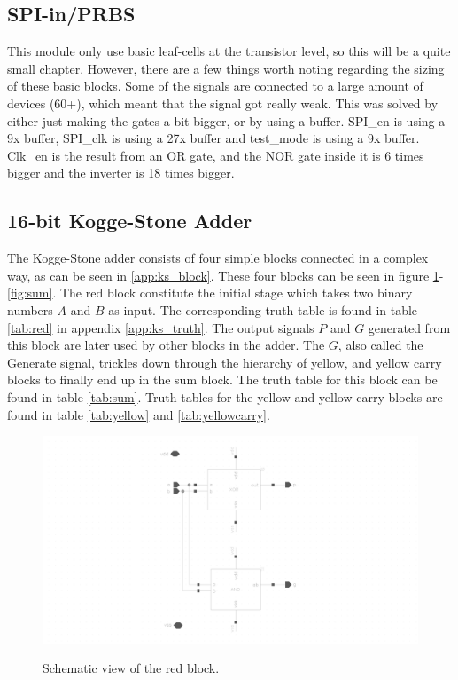 
\subsection{SPI-in/PRBS}
This module only use basic leaf-cells at the transistor level, so this will be a quite small chapter. However, there are a few things worth noting regarding the sizing of these basic blocks. Some of the signals are connected to a large amount of devices (60+), which meant that the signal got really weak. This was solved by either just making the gates a bit bigger, or by using a buffer. SPI\_en is using a 9x buffer, SPI\_clk is using a 27x buffer and test\_mode is using a 9x buffer. Clk\_en is the result from an OR gate, and the NOR gate inside it is 6 times bigger and the inverter is 18 times bigger.

\subsection{16-bit Kogge-Stone Adder}
The Kogge-Stone adder consists of four simple blocks connected in a complex way, as can be seen in \ref{app:ks_block}. These four blocks can be seen in figure \ref{fig:red}-\ref{fig:sum}. The red block constitute the initial stage which takes two binary numbers $A$ and $B$ as input. The corresponding truth table is found in table \ref{tab:red} in appendix \ref{app:ks_truth}. The output signals $P$ and $G$ generated from this block are later used by other blocks in the adder. The $G$, also called the Generate signal, trickles down through the hierarchy of yellow, and yellow carry blocks to finally end up in the sum block. The truth table for this block can be found in table \ref{tab:sum}. Truth tables for the yellow and yellow carry blocks are found in table \ref{tab:yellow} and \ref{tab:yellowcarry}.

\begin{figure}[H]
  \centering
  \captionsetup{justification=centering}
  {\includegraphics[width=2.0\textwidth]{../figures/red}}
  \caption{Schematic view of the red block.} \label{fig:red}
\end{figure}

